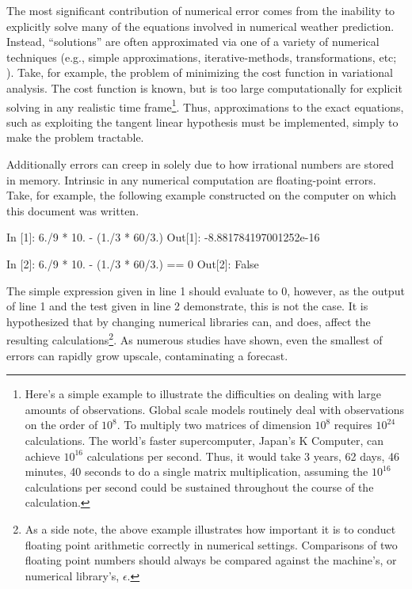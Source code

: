 The most significant contribution of numerical error comes from the inability to explicitly solve many of the equations involved in numerical weather prediction. Instead, ``solutions'' are often approximated via one of a variety of numerical techniques (e.g., simple approximations, iterative-methods, transformations, etc; \citealp{thomas2002floatingpoint}). Take, for example, the problem of minimizing the cost function in variational analysis. The cost function is known, but is too large computationally for explicit solving in any realistic time frame\footnote{Here's a simple example to illustrate the difficulties on dealing with large amounts of observations. Global scale models routinely deal with observations on the order of $10^8$. To multiply two matrices of dimension $10^8$ requires $10^{24}$ calculations. The world's faster supercomputer, Japan's K Computer, can achieve $10^{16}$ calculations per second. Thus, it would take 3 years, 62 days, 46 minutes, 40 seconds to do a single matrix multiplication, assuming the $10^{16}$ calculations per second could be sustained throughout the course of the calculation.}. Thus, approximations to the exact equations, such as exploiting the tangent linear hypothesis must be implemented, simply to make the problem tractable.


Additionally errors can creep in solely due to how irrational numbers are stored in memory. Intrinsic in any numerical computation are floating-point errors. Take, for example, the following example constructed on the computer on which this document was written.


\vspace{2em}
\begin{code}
    In [1]: 6./9 * 10. - (1./3 * 60/3.)
    Out[1]: -8.881784197001252e-16

    In [2]: 6./9 * 10. - (1./3 * 60/3.) == 0
    Out[2]: False
\end{code}
\vspace{2em}


\noindent The simple expression given in line 1 should evaluate to 0, however, as the output of line 1 and the test given in line 2 demonstrate, this is not the case.  It is hypothesized that by changing numerical libraries can, and does, affect the resulting calculations\footnote{As a side note, the above example illustrates how important it is to conduct floating point arithmetic correctly in numerical settings. Comparisons of two floating point numbers should always be compared against the machine's, or numerical library's, $\epsilon$.}. As numerous studies have shown, even the smallest of errors can rapidly grow upscale, contaminating a forecast.


